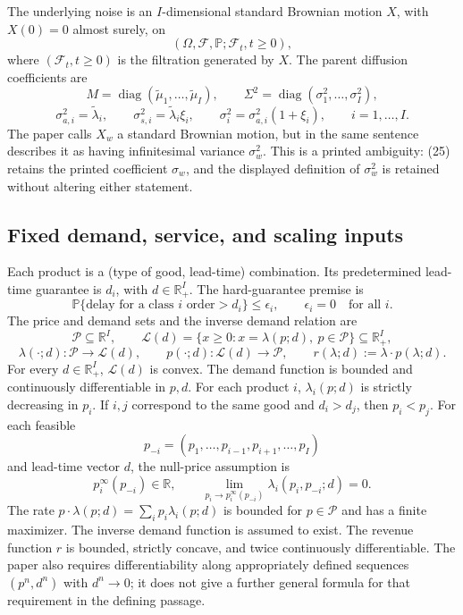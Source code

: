 \documentclass[11pt]{article}
\begin{document}
The underlying noise is an \(I\)-dimensional standard Brownian motion \(X\), with \(X(0)=0\) almost surely, on
\[
(\Omega,\mathcal F,\mathbb P;\mathcal F_t,t\geq0),
\]
where \((\mathcal F_t,t\geq0)\) is the filtration generated by \(X\). The parent diffusion coefficients are
\[
M=\operatorname{diag}(\tilde\mu_1,\ldots,\tilde\mu_I),
\qquad
\Sigma^2=\operatorname{diag}(\sigma_1^2,\ldots,\sigma_I^2),
\]
\[
\sigma_{a,i}^2=\tilde\lambda_i,
\qquad \sigma_{s,i}^2=\tilde\lambda_i\xi_i,
\qquad \sigma_i^2=\sigma_{a,i}^2(1+\xi_i),
\qquad i=1,\ldots,I.
\]
The paper calls \(X_w\) a standard Brownian motion, but in the same sentence describes it as having infinitesimal variance \(\sigma_w^2\). This is a printed ambiguity: (25) retains the printed coefficient \(\sigma_w\), and the displayed definition of \(\sigma_w^2\) is retained without altering either statement.

\subsection*{Fixed demand, service, and scaling inputs}

Each product is a (type of good, lead-time) combination. Its predetermined lead-time guarantee is \(d_i\), with \(d\in\mathbb R_+^I\). The hard-guarantee premise is
\[
\mathbb P\{\text{delay for a class }i\text{ order}>d_i\}\leq\epsilon_i,
\qquad \epsilon_i=0\quad\text{for all }i.
\]
The price and demand sets and the inverse demand relation are
\[
\mathcal P\subseteq\mathbb R^I,
\qquad
\mathcal L(d)=\{x\geq0:x=\lambda(p;d),\ p\in\mathcal P\}
\subseteq\mathbb R_+^I,
\]
\[
\lambda(\cdot;d):\mathcal P\longrightarrow\mathcal L(d),
\qquad
p(\cdot;d):\mathcal L(d)\longrightarrow\mathcal P,
\qquad
r(\lambda;d):=\lambda\cdot p(\lambda;d).
\]
For every \(d\in\mathbb R_+^I\), \(\mathcal L(d)\) is convex. The demand function is bounded and continuously differentiable in \(p,d\). For each product \(i\), \(\lambda_i(p;d)\) is strictly decreasing in \(p_i\). If \(i,j\) correspond to the same good and \(d_i>d_j\), then \(p_i<p_j\). For each feasible
\[
p_{-i}=(p_1,\ldots,p_{i-1},p_{i+1},\ldots,p_I)
\]
and lead-time vector \(d\), the null-price assumption is
\[
p_i^\infty(p_{-i})\in\mathbb R,
\qquad
\lim_{p_i\to p_i^\infty(p_{-i})}
\lambda_i(p_i,p_{-i};d)=0.
\]
The rate \(p\cdot\lambda(p;d)=\sum_i p_i\lambda_i(p;d)\) is bounded for \(p\in\mathcal P\) and has a finite maximizer. The inverse demand function is assumed to exist. The revenue function \(r\) is bounded, strictly concave, and twice continuously differentiable. The paper also requires differentiability along appropriately defined sequences \((p^n,d^n)\) with \(d^n\to0\); it does not give a further general formula for that requirement in the defining passage.
\end{document}
